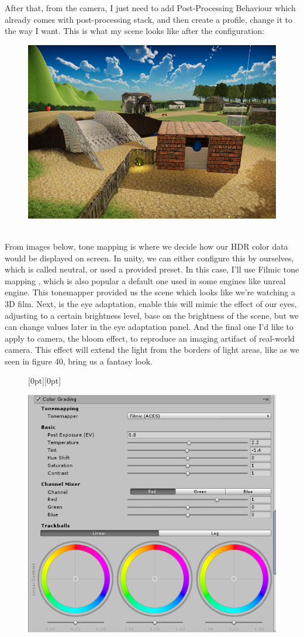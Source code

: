 \documentclass[a4paper, 13pt]{extarticle}
\begin{document}
{After that, from the camera, I just need to add Post-Processing Behaviour which already comes with post-processing stack, and then create a profile, change it to the way I want. This is what my scene looks like after the configuration:
\begin{figure}[h] 
	\begin{minipage}{1\textwidth}
		\centering
		\includegraphics[width=0.45\linewidth]{intructions/3d_film.png}
		\centering
		\label{fig:test35}
	\end{minipage}      	
\end{figure} \\
From images below, tone mapping is where we decide how our HDR color data would be displayed on screen. In unity, we can either configure this by ourselves, which is called neutral, or used a provided preset. In this case, I'll use Filmic tone mapping , which is also popular a default one used in some engines like unreal engine. This tonemapper provided us the scene which looks like we're watching a 3D film. Next, is the eye adaptation, enable this will mimic the effect of our eyes, adjusting to a certain brightness level, base on the brightness of the scene, but we can change values later in the eye adaptation panel. And the final one I'd like to apply to camera, the bloom effect, to reproduce an imaging artifact of real-world camera. This effect will extend the light from the borders of light areas, like as we seen in figure 40, bring us a fantasy look.  
\begin{figure}[h] 
\raisebox{-32mm}[0pt][0pt]{
 	\begin{minipage}{0.45\textwidth}
 		\centering
 		\includegraphics[width=0.8\linewidth]{intructions/Tone_mapper.png}

\end{minipage}}
\end{figure}}
\end{document}
